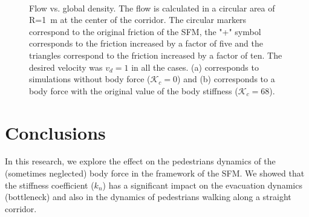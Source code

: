 \documentclass[preprint,12pt]{elsarticle}
\begin{document}
\begin{figure}[!htbp]
\centering
    \ 
    \\
\caption[width=0.47\columnwidth]{Flow vs. global density. The flow is calculated in a circular area of R=1~m at the center of the corridor. The circular markers correspond to the original friction of the SFM, the "+" symbol corresponds to the friction increased by a factor of five and the triangles correspond to the friction increased by a factor of ten. The desired velocity was $v_d=1$ in all the cases. (a) corresponds to simulations without body force ($\mathcal{K}_c =$0) and (b) corresponds to a body force with the original value of the body stiffness ($\mathcal{K}_c =$68).}
\label{flow_density}
\end{figure}



\section{\label{conclusions}Conclusions}


In this research, we explore the effect on the pedestrians dynamics of the (sometimes neglected) body force in the framework of the SFM. We showed that the stiffness coefficient ($k_n$) has a significant impact on the evacuation dynamics (bottleneck) and also in the dynamics of pedestrians walking along a straight corridor.\\
\end{document}
